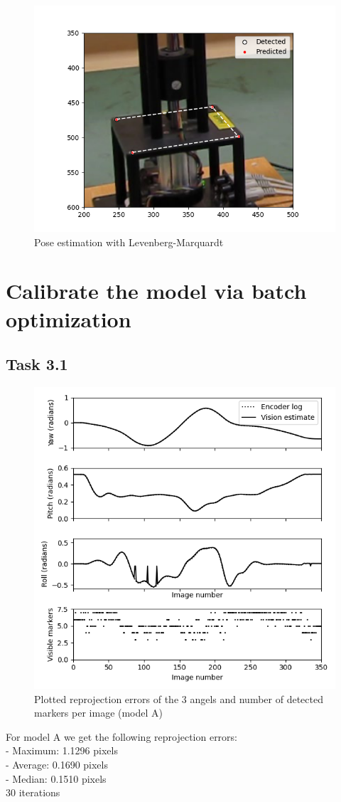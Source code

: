 \documentclass[a4paper]{article} %
\begin{document}
    \begin{figure}[h]
        \centering
        \includegraphics[width= 0.5 \linewidth]{../python/out_part2_2}
        \caption{Pose estimation with Levenberg-Marquardt}
    \end{figure}

\section{Calibrate the model via batch optimization}
    \subsection*{Task 3.1}
    \begin{figure}[h]
        \centering
        \includegraphics[width=0.5 \linewidth]{../python/out_part3_Mod-A}
        \caption{Plotted reprojection errors of the 3 angels and number of detected markers per image (model A)}
    \end{figure}
    For model A we get the following reprojection errors: \\
    - Maximum: 1.1296 pixels\\
    - Average: 0.1690 pixels\\
    - Median: 0.1510 pixels\\
    30 iterations
\end{document}
